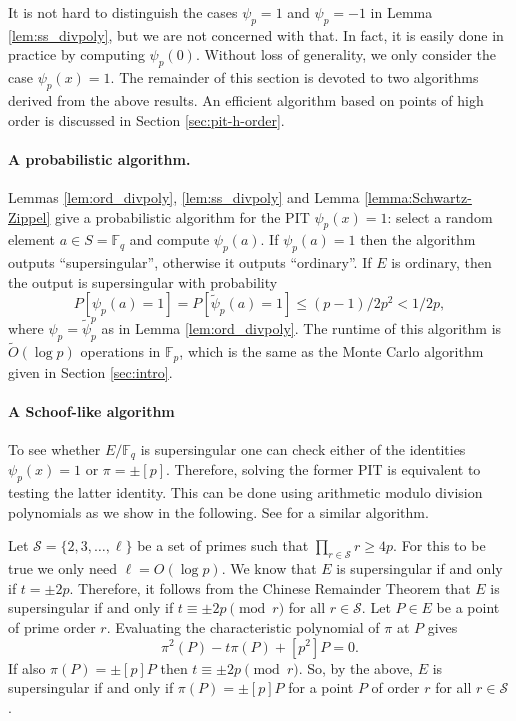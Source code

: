 \documentclass[12pt]{article}
\theoremstyle{plain}
\theoremstyle{definition}
\newcommand{\tildO}{\tilde{O}}
\def\F{\ensuremath{\mathbb{F}}}
\begin{document}
It is not hard to distinguish the cases $\psi_p = 1$ and $\psi_p = -1$ in Lemma 
\ref{lem:ss_divpoly}, but we are not concerned with that. In fact, it is easily done in practice 
by computing $\psi_p(0)$. Without loss of generality, we only consider the case $\psi_p(x) = 1$. 
The remainder of this section is devoted to two algorithms derived from the above results. An 
efficient algorithm based on points of high order is discussed in Section \ref{sec:pit-h-order}.

\paragraph{A probabilistic algorithm.}
Lemmas \ref{lem:ord_divpoly}, \ref{lem:ss_divpoly} and Lemma \ref{lemma:Schwartz-Zippel} give a 
probabilistic algorithm for the PIT $\psi_p(x) = 1$: select a random element $a \in S = \F_q$ and 
compute $\psi_p(a)$. If $\psi_p(a) = 1$ then the algorithm outputs ``supersingular'', otherwise it 
outputs ``ordinary''. If $E$ is ordinary, then the output is supersingular with probability 
\[ P[\psi_p(a) = 1] = P[\tilde{\psi}_p(a) = 1] \le (p - 1) / 2p^2 < 1 / 2p, \] 
where $\psi_p = \tilde{\psi}_p^p$ as in Lemma \ref{lem:ord_divpoly}. The runtime of this algorithm 
is $\tildO(\log p)$ operations in $\F_p$, which is the same as the Monte Carlo algorithm given in 
Section \ref{sec:intro}.

\paragraph{A Schoof-like algorithm}
To see whether $E/\F_q$ is supersingular one can check either of the identities $\psi_p(x) = 1$ or 
$\pi = \pm [p]$. Therefore, solving the former PIT is equivalent to testing the latter identity. 
This can be done using arithmetic modulo division polynomials as we show in the following. See 
\cite[Section 2.2]{sutherland2012} for a similar algorithm.

Let $\mathcal{S} = \{2, 3, \dots, \ell\}$ be a set of primes such that $\prod_{r \in \mathcal{S}} r 
\ge 4p$. For this to be true we only need $\ell = O(\log p)$. We know that $E$ is supersingular if 
and only if $t = \pm 2p$. Therefore, it follows from the Chinese Remainder Theorem that $E$ is 
supersingular if and only if $t \equiv \pm 2p \pmod{r}$ for all $r \in \mathcal{S}$. Let $P \in E$ 
be a point of prime order $r$. Evaluating the characteristic polynomial of $\pi$ at $P$ gives
\[ \pi^2(P) - t\pi(P) + [p^2]P = 0. \]
If also $\pi(P) = \pm [p]P$ then $t \equiv \pm 2p \pmod{r}$. So, by the above, $E$ is supersingular 
if and only if $\pi(P) = \pm [p]P$ for a point $P$ of order $r$ for all $r \in \mathcal{S}$.
\end{document}

